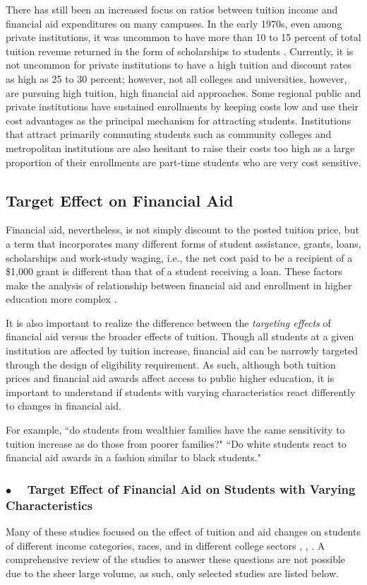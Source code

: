 \documentclass[12pt,english]{report}
\begin{document}
There has still been an increased focus on ratios between tuition income and financial aid expenditures on many campuses. In the early 1970s, even among private institutions, it was uncommon to have more than 10 to 15 percent of total tuition revenue returned in the form of scholarships to students \citep{Hossler1998}. Currently, it is not uncommon for private institutions to have a high tuition and discount rates as high as 25 to 30 percent; however, not all colleges and universities, however, are pursuing high tuition, high financial aid approaches. Some regional public and private institutions have sustained enrollments by keeping costs low and use their cost advantages as the principal mechanism for attracting students. Institutions that attract primarily commuting students such as community colleges and metropolitan institutions are also hesitant to raise their costs too high as a large proportion of their enrollments are part-time students who are very cost sensitive.

\subsection{Target Effect on Financial Aid}
Financial aid, nevertheless, is not simply discount to the posted tuition price, but a term that incorporates many different forms of student assistance, grants, loans, scholarships and work-study waging, i.e., the net cost paid to be a recipient of a \$1,000 grant is different than that of a student receiving a loan. These factors make the analysis of relationship between financial aid and enrollment in higher education more complex \citep{Heller1997}.

It is also important to realize the difference between the \textit{targeting effects}  of financial aid versus the broader effects of tuition. Though all students at a given institution are affected by tuition increase, financial aid can be narrowly targeted through the design of eligibility requirement.  As such, although both tuition prices and financial aid awards affect access to public higher education, it is important to understand if students with varying characteristics react differently to changes in financial aid.

For example, ``do students from wealthier families have the same sensitivity to tuition increase as do those from poorer families?"  ``Do white students react to financial aid awards in a fashion similar to black students."

\subsubsection{$\bullet \quad$  Target Effect of Financial Aid on Students with Varying Characteristics }
Many of these studies focused on the effect of tuition and aid changes on students of different income categories, races, and in different college sectors \citep{Jackson1978}, \citep{Braunstein1999}, \citep{Heller1997}.  A comprehensive review of the studies to answer these questions are not possible due to the sheer large volume, as such, only selected studies are listed below.
\end{document}
